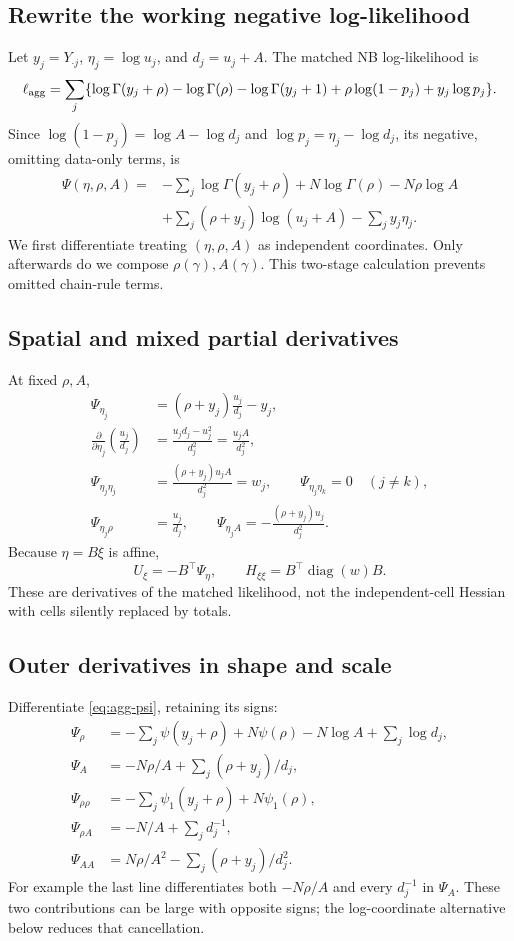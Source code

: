 \documentclass[11pt,a4paper]{article}
\newcommand{\diag}{\operatorname{diag}}
\numberwithin{equation}{section}
\begin{document}
\subsection{Rewrite the working negative log-likelihood}
Let $y_j=Y_{\cdot j}$, $\eta_j=\log u_j$, and $d_j=u_j+A$.
The matched NB log-likelihood is
\[
 \ell_{\rm agg}
 =\sum_j\{\log\Gamma(y_j+\rho)-\log\Gamma(\rho)
      -\log\Gamma(y_j+1)+\rho\log(1-p_j)+y_j\log p_j\}.
\]
Since $\log(1-p_j)=\log A-\log d_j$ and
$\log p_j=\eta_j-\log d_j$, its negative, omitting data-only terms, is
\begin{equation}\label{eq:agg-psi}
 \begin{split}
 \Psi(\eta,\rho,A)={}&-\sum_j\log\Gamma(y_j+\rho)
       +N\log\Gamma(\rho)-N\rho\log A\\
   &+\sum_j(\rho+y_j)\log(u_j+A)-\sum_jy_j\eta_j .
 \end{split}
\end{equation}
We first differentiate treating $(\eta,\rho,A)$ as independent
coordinates. Only afterwards do we compose $\rho(\gamma),A(\gamma)$.
This two-stage calculation prevents omitted chain-rule terms.

\subsection{Spatial and mixed partial derivatives}
At fixed $\rho,A$,
\begin{align}
 \Psi_{\eta_j}&=(\rho+y_j)\frac{u_j}{d_j}-y_j,\\
 \frac{\partial}{\partial\eta_j}\left(\frac{u_j}{d_j}\right)
 &=\frac{u_jd_j-u_j^2}{d_j^2}=\frac{u_jA}{d_j^2},\\
 \Psi_{\eta_j\eta_j}
 &=\frac{(\rho+y_j)u_jA}{d_j^2}=w_j,\qquad
 \Psi_{\eta_j\eta_k}=0\quad(j\ne k),\\
 \Psi_{\eta_j\rho}&=\frac{u_j}{d_j},\qquad
 \Psi_{\eta_j A}=-\frac{(\rho+y_j)u_j}{d_j^2}.
 \label{eq:agg-local}
\end{align}
Because $\eta=B\xi$ is affine,
\[
 U_\xi=-B^\top\Psi_\eta,\qquad
 H_{\xi\xi}=B^\top\diag(w)B.
\]
These are derivatives of the matched likelihood, not the independent-cell
Hessian with cells silently replaced by totals.

\subsection{Outer derivatives in shape and scale}
Differentiate \eqref{eq:agg-psi}, retaining its signs:
\begin{align}
 \Psi_\rho&=-\sum_j\psi(y_j+\rho)+N\psi(\rho)
                   -N\log A+\sum_j\log d_j,\\
 \Psi_A&=-N\rho/A+\sum_j(\rho+y_j)/d_j,\\
 \Psi_{\rho\rho}&=-\sum_j\psi_1(y_j+\rho)+N\psi_1(\rho),\\
 \Psi_{\rho A}&=-N/A+\sum_jd_j^{-1},\\
 \Psi_{AA}&=N\rho/A^2-\sum_j(\rho+y_j)/d_j^2.
 \label{eq:agg-outer}
\end{align}
For example the last line differentiates both $-N\rho/A$
and every $d_j^{-1}$ in $\Psi_A$. These two contributions can be
large with opposite signs; the log-coordinate alternative below
reduces that cancellation.
\end{document}
